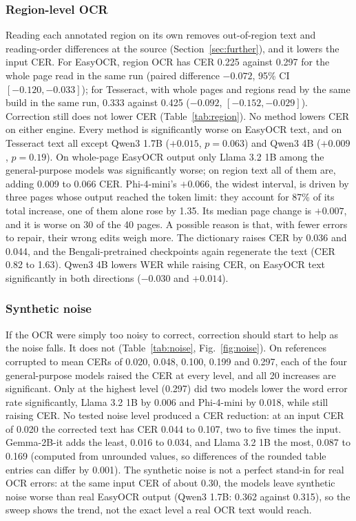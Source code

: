 \documentclass[conference]{IEEEtran}
\begin{document}
\subsubsection{Region-level OCR}
\label{sec:region}
Reading each annotated region on its own removes out-of-region text and reading-order differences at the source (Section~\ref{sec:further}), and it lowers the input CER. For EasyOCR, region OCR has CER 0.225 against 0.297 for the whole page read in the same run (paired difference $-0.072$, 95\% CI $[-0.120,-0.033]$); for Tesseract, with whole pages and regions read by the same build in the same run, 0.333 against 0.425 ($-0.092$, $[-0.152,-0.029]$). Correction still does not lower CER (Table~\ref{tab:region}). No method lowers CER on either engine. Every method is significantly worse on EasyOCR text, and on Tesseract text all except Qwen3 1.7B ($+0.015$, $p=0.063$) and Qwen3 4B ($+0.009$, $p=0.19$). On whole-page EasyOCR output only Llama 3.2 1B among the general-purpose models was significantly worse; on region text all of them are, adding 0.009 to 0.066 CER. Phi-4-mini's $+0.066$, the widest interval, is driven by three pages whose output reached the token limit: they account for 87\% of its total increase, one of them alone rose by 1.35. Its median page change is $+0.007$, and it is worse on 30 of the 40 pages. A possible reason is that, with fewer errors to repair, their wrong edits weigh more. The dictionary raises CER by 0.036 and 0.044, and the Bengali-pretrained checkpoints again regenerate the text (CER 0.82 to 1.63). Qwen3 4B lowers WER while raising CER, on EasyOCR text significantly in both directions ($-0.030$ and $+0.014$).



\subsubsection{Synthetic noise}
\label{sec:noise}
If the OCR were simply too noisy to correct, correction should start to help as the noise falls. It does not (Table~\ref{tab:noise}, Fig.~\ref{fig:noise}). On references corrupted to mean CERs of 0.020, 0.048, 0.100, 0.199 and 0.297, each of the four general-purpose models raised the CER at every level, and all 20 increases are significant. Only at the highest level (0.297) did two models lower the word error rate significantly, Llama 3.2 1B by 0.006 and Phi-4-mini by 0.018, while still raising CER. No tested noise level produced a CER reduction: at an input CER of 0.020 the corrected text has CER 0.044 to 0.107, two to five times the input. Gemma-2B-it adds the least, 0.016 to 0.034, and Llama 3.2 1B the most, 0.087 to 0.169 (computed from unrounded values, so differences of the rounded table entries can differ by 0.001). The synthetic noise is not a perfect stand-in for real OCR errors: at the same input CER of about 0.30, the models leave synthetic noise worse than real EasyOCR output (Qwen3 1.7B: 0.362 against 0.315), so the sweep shows the trend, not the exact level a real OCR text would reach.
\end{document}
